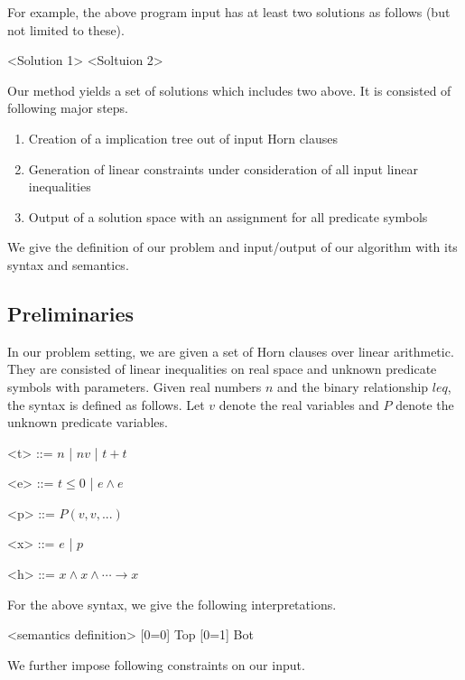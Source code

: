 \documentclass{llncs}
\begin{document}
For example, the above program input has at least two solutions as follows (but not limited to these).

<Solution 1>     <Soltuion 2>

Our method yields a set of solutions which includes two above. It is consisted of following major steps.

\begin{enumerate}
\item Creation of a implication tree out of input Horn clauses
\item Generation of linear constraints under consideration of all input linear inequalities
\item Output of a solution space with an assignment for all predicate symbols
\end{enumerate}

We give the definition of our problem and input/output of our algorithm with its syntax and semantics.

\subsection{Preliminaries}

In our problem setting, we are given a set of Horn clauses over linear arithmetic. They are consisted of linear inequalities on real space and unknown predicate symbols with parameters. Given real numbers $n$ and the binary relationship $leq$, the syntax is defined as follows. Let $v$ denote the real variables and $P$ denote the unknown predicate variables.

\setlength{\grammarindent}{6em}
\begin{grammar}

<t> ::= $n$ | $nv$ | $t + t$

<e> ::= $t \leq 0$ | $e \wedge e$

<p> ::= $P (v, v, ... )$

<x> ::= $e$ | $p$  %

<h> ::= $x \wedge x \wedge \cdots \longrightarrow x$

\end{grammar}


For the above syntax, we give the following interpretations.

<semantics definition>
[0=0] Top
[0=1] Bot

We further impose following constraints on our input.
\end{document}

